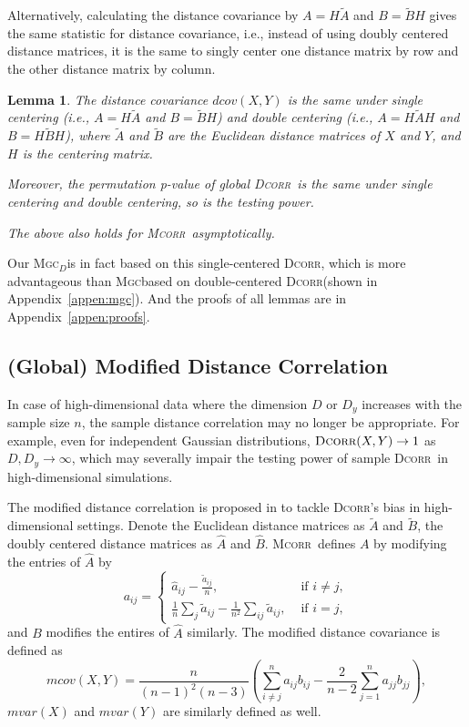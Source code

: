 \documentclass[11pt]{article}
\providecommand{\sct}[1]{{\normalfont\textsc{#1}}}
\newcommand{\Mgc}{\sct{Mgc}}
\newcommand{\Mgcd}{\sct{Mgc$_D$}}
\newcommand{\Dcorr}{\sct{Dcorr}}
\newcommand{\Mcorr}{\sct{Mcorr}}
\newtheorem{lem}{Lemma}
\begin{document}
Alternatively, calculating the distance covariance by $A=H\tilde{A}$ and $B=\tilde{B}H$ gives the same statistic for distance covariance, i.e., instead of using doubly centered distance matrices, it is the same to singly center one distance matrix by row and the other distance matrix by column.
\begin{lem}
The distance covariance $dcov(X,Y)$ is the same under single centering (i.e., $A=H\tilde{A}$ and $B=\tilde{B}H$) and double centering (i.e., $A=H\tilde{A}H$ and $B=H\tilde{B}H$), where $\tilde{A}$ and $\tilde{B}$ are the Euclidean distance matrices of $X$ and $Y$, and $H$ is the centering matrix. 

Moreover, the permutation p-value of global \Dcorr~is the same under single centering and double centering, so is the testing power.

The above also holds for \Mcorr~asymptotically.
\end{lem}
Our \Mgcd is in fact based on this single-centered \Dcorr, which is more advantageous than \Mgc based on double-centered \Dcorr (shown in Appendix~\ref{appen:mgc}). And the proofs of all lemmas are in Appendix~\ref{appen:proofs}.


\subsection{(Global) Modified Distance Correlation}
\label{appen:mcorr}
In case of high-dimensional data where the dimension $D$ or $D_y$ increases with the sample size $n$, the sample distance correlation may no longer be appropriate. For example, even for independent Gaussian distributions, $\Dcorr(X,Y) \rightarrow 1$ as $D, D_y \rightarrow \infty$, which may severally impair the testing power of sample \Dcorr~in high-dimensional simulations.

The modified distance correlation is proposed in \cite{SzekelyRizzo2013a} to tackle   \Dcorr's bias in high-dimensional settings. Denote the Euclidean distance matrices as $\tilde{A}$ and $\tilde{B}$, the doubly centered distance matrices as $\hat{A}$ and $\hat{B}$.  \Mcorr~defines $A$ by modifying the entries of $\hat{A}$ by
\[a_{ij} = \left\{
  \begin{array}{lr}
    \hat{a}_{ij}-\frac{\tilde{a}_{ij}}{n}, & \mbox{ if } i \neq j, \\
    \frac{1}{n}\sum_{j}\tilde{a}_{ij}-\frac{1}{n^2}\sum_{ij}\tilde{a}_{ij}, &\mbox{ if } i = j,
  \end{array}
\right.
\]
and  $B$ modifies the entires of $\hat{A}$ similarly.
The modified distance covariance is defined as
\begin{equation*}
mcov(X,Y)=\frac{n}{(n-1)^2(n-3)}\left(\sum_{i \neq j}^{n}a_{ij}b_{ij}-\frac{2}{n-2}\sum_{j=1}^{n}a_{jj}b_{jj}\right),
\end{equation*}
$mvar(X)$ and $mvar(Y)$ are similarly defined as well.
\end{document}
